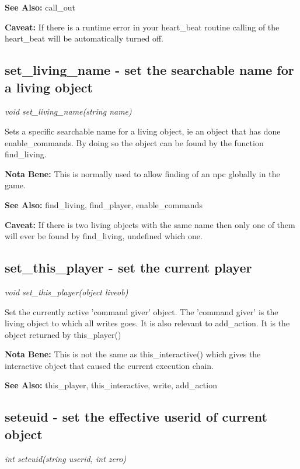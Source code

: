     {\bf See Also: }    call\_out

    {\bf Caveat: }  If there is a runtime error in your heart\_beat routine calling
    of the heart\_beat will be automatically turned off.



\subsection{set\_living\_name - set the searchable name for a living object}

    {\em void set\_living\_name(string name)}

    Sets a specific searchable name for a living object, ie an object
    that has done enable\_commands. By doing so the object can be found
    by the function find\_living. 

    {\bf Nota Bene: }   This is normally used to allow finding of an npc globally in the
    game.

    {\bf See Also: }    find\_living, find\_player, enable\_commands

    {\bf Caveat: }  If there is two living objects with the same name then only one
    of them will ever be found by find\_living, undefined which one.



\subsection{set\_this\_player - set the current player}

    {\em void set\_this\_player(object liveob)}

    Set the currently active 'command giver' object. The 'command giver'
    is the living object to which all writes goes. It is also relevant
    to add\_action. It is the object returned by this\_player()

    {\bf Nota Bene: }   This is not the same as this\_interactive() which gives the interactive
    object that caused the current execution chain.

    {\bf See Also: }    this\_player, this\_interactive, write, add\_action



\subsection{seteuid - set the effective userid of current object}

    {\em int seteuid(string userid, int zero) }


